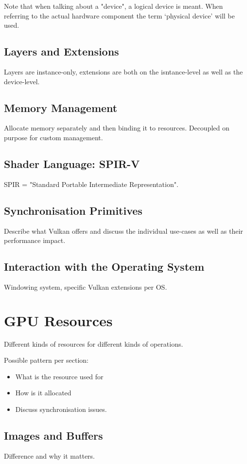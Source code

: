 \documentclass[draft,12pt]{report}
\begin{document}
    Note that when talking about a "device", a logical device is meant. When referring to the actual hardware component the term `physical device' will be used.

    \section{Layers and Extensions}
      Layers are instance-only, extensions are both on the isntance-level as well as the device-level.

    \section{Memory Management}
      Allocate memory separately and then binding it to resources. Decoupled on purpose for custom management.

    \section{Shader Language: SPIR-V}
      SPIR = "Standard Portable Intermediate Representation".

    \section{Synchronisation Primitives}
      Describe what Vulkan offers and discuss the individual use-cases as well as their performance impact.

    \section{Interaction with the Operating System}
      Windowing system, specific Vulkan extensions per OS.


  \chapter{GPU Resources}
    Different kinds of resources for different kinds of operations.

    Possible pattern per section:
    \begin{itemize}
      \item What is the resource used for
      \item How is it allocated
      \item Discuss synchronisation issues.
    \end{itemize}

    \section{Images and Buffers}
      Difference and why it matters.
\end{document}
